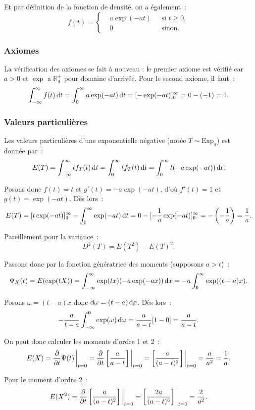 \documentclass{article}
\renewcommand{\pd}[1]{\frac {\partial}{\partial #1}}
\begin{document}
		Et par définition de la fonction de densité, on a également~:
		\[f(t) = \left\{\begin{aligned} & a\exp(-at)\,\, &\text{ si $t \geq 0$},\\& 0 &\text{ sinon}.\end{aligned}\right.\]

		\subsubsection{Axiomes}
			La vérification des axiomes se fait à nouveau : le premier axiome est vérifié car $a > 0$ et $\exp$ a $\mathbb R_0^+$ pour domaine d'arrivée. Pour le second
			axiome, il faut~:
			\[\int_{-\infty}^\infty f(t)\dif t = \int_0^\infty a\exp(-at)\dif t = [-\exp(-at)]_0^\infty = 0 - (-1) = 1.\]

		\subsubsection{Valeurs particulières}
			Les valeurs particulières d'une exponentielle négative (notée $T \sim \text{Exp}_a$) est donnée par~:
			\[E(T) = \int_{-\infty}^\infty tf_T(t)\dif t = \int_0^\infty tf_T(t)\dif t = \int_0^\infty t(-a\exp(-at))\dif t.\]

			Posons donc $f(t) = t$ et $g'(t) = -a\exp(-at)$, d'où $f'(t) = 1$ et $g(t) = \exp(-at)$. Dès lors~:
			\[E(T) = [t\exp(-at)]_0^\infty - \int_0^\infty \exp(-at)\dif t = 0 - [-\frac 1a\exp(-at)]_0^\infty = -\left(-\frac 1a\right) = \frac 1a.\]

			Pareillement pour la variance~:
			\[D^2(T) = E(T^2)-E(T)^2.\]

			Passons donc par la fonction génératrice des moments (supposons $a > t$)~:
			\[\Psi_X(t) = E(\exp(tX)) = \int_{-\infty}^\infty \exp(tx)(-a\exp(-ax))\dif x = -a\int_0^\infty \exp((t-a)x).\]

			Posons $\omega = (t-a)x$ donc $\dif\omega = (t-a)\dif x$. Dès lors~:
			\[-\frac a{t-a}\int_{-\infty}^0\exp(\omega)\dif\omega = \frac a{a-t}[1-0] = \frac a{a-t}.\]

			On peut donc calculer les moments d'ordre 1 et 2~:
			\[E(X) = \pd t\Psi(t)\sVert[3]_{t=0} = \pd t\left[\frac a{a-t}\right]\sVert[3]_{t=0} = \left[\frac a{(a-t)^2}\right]\sVert[3]_{t=0}
				= \frac a{a^2} = \frac 1a.\]

			Pour le moment d'ordre 2~:
			\[E(X^2) = \pd t\left[\frac a{(a-t)^2}\right]\sVert[3]_{t=0} = \left[\frac {2a}{(a-t)^3}\right]\sVert[3]_{t=0} = \frac 2{a^2}.\]
\end{document}
